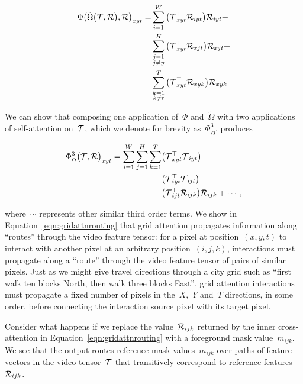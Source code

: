 \begin{equation}
\begin{split}
        \Phi{\big({\tilde{\Omega}\big(\mathcal{T}{}, \mathcal{R}{}\big)}, \mathcal{R}{}\big)}_{xyt} =
        & \sum_{i = 1}^W \big(\mathcal{T}{}_{xyt}^\top\mathcal{R}{}_{iyt}\big)\mathcal{R}{}_{iyt} + \\
        & \sum_{\substack{j = 1 \\ j \neq y}}^H \big(\mathcal{T}{}_{xyt}^\top \mathcal{R}{}_{xjt}\big)\mathcal{R}{}_{xjt} + \\
        & \sum_{\substack{k = 1 \\ k \neq t}}^T \big(\mathcal{T}{}_{xyt}^\top \mathcal{R}{}_{xyk}\big)\mathcal{R}{}_{xyk}
\end{split}
\end{equation}

We can show that composing one application of~$\Phi$ and~$\tilde{\Omega}$ with
two applications of self-attention on~$\mathcal{T}{}$, which we denote for brevity
as~$\Phi^3_{\tilde{\Omega}}$, produces

\begin{equation}
\begin{split}
        {\Phi^3_{\tilde{\Omega}}\big(\mathcal{T}{}, \mathcal{R}{}\big)}_{xyt} =
                \sum_{i = 1}^W \sum_{j = 1}^H \sum_{k = 1}^T
                & \big(\mathcal{T}{}_{xyt}^\top\mathcal{T}{}_{iyt}\big) \\
                & \big(\mathcal{T}{}_{iyt}^\top \mathcal{T}{}_{ijt}\big) \\
                & \big(\mathcal{T}{}_{ijt}^\top \mathcal{R}{}_{ijk}\big)\mathcal{R}{}_{ijk} + \cdots,
\end{split}
\label{eqn:gridattnrouting}
\end{equation}

\noindent where~$\cdots$ represents other similar third order terms.
We show in Equation~\ref{eqn:gridattnrouting} that grid attention propagates
information along ``routes'' through the video feature tensor: for a pixel at
position~$(x, y, t)$ to interact with another pixel at an arbitrary
position~$(i, j, k)$, interactions must propagate along a ``route''  through
the video feature tensor of pairs of similar pixels.
Just as we might give travel directions through a city grid such as ``first
walk ten blocks North, then walk three blocks East'', grid attention
interactions must propagate a fixed number of pixels in the~$X$,~$Y$ and~$T$
directions, in some order, before connecting the interaction source pixel with
its target pixel.

Consider what happens if we replace the value~$\mathcal{R}{}_{ijk}$ returned by
the inner cross-attention in Equation~\ref{eqn:gridattnrouting} with a
foreground mask value~$m_{ijk}$.
We see that the output routes reference mask values~$m_{ijk}$ over paths of
feature vectors in the video tensor~$\mathcal{T}{}$ that transitively correspond
to reference features~$\mathcal{R}{}_{ijk}$.

